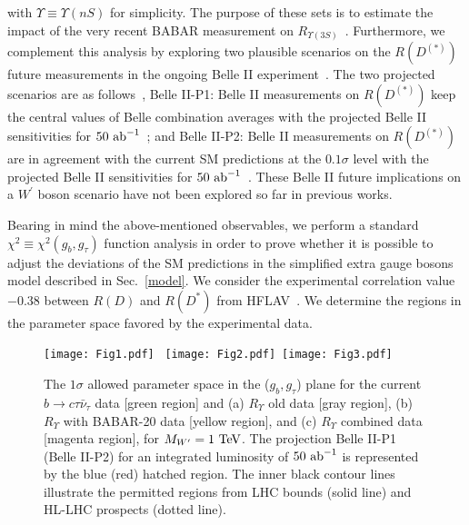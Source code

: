 \documentclass[reprint,showpacs,aps,prd,nofootinbib,superscriptaddress,longbibliography]{revtex4-1}
\begin{document}
\noindent with $\Upsilon \equiv \Upsilon(nS)$ for simplicity. The purpose of these sets is to estimate the impact of the very recent BABAR measurement on $R_{\Upsilon(3S)}$~\cite{Lees:2020kom}. Furthermore, we complement this analysis by exploring two plausible scenarios on the $R(D^{(\ast)})$ future measurements in the ongoing Belle II experiment~\cite{Kou:2018nap}. The two projected scenarios are as follows~\cite{Cardozo:2020uol}, Belle II-P1: Belle II measurements on $R(D^{(\ast)})$ keep the central values of Belle combination averages with the projected Belle II sensitivities for $50 \ {\rm ab}^{-1}$~\cite{Kou:2018nap}; and Belle II-P2: Belle II measurements on $R(D^{(\ast)})$ are in agreement with the current SM predictions at the $0.1\sigma$ level with the projected Belle II sensitivities for $50 \ {\rm ab}^{-1}$~\cite{Kou:2018nap}. These Belle II future implications on a $W^{\prime}$ boson scenario have not been explored so far in previous works. 

Bearing in mind the above-mentioned observables, we perform a standard $\chi^2 \equiv \chi^2(g_b,g_\tau)$ function analysis in order to prove whether it is possible to adjust the deviations of the SM predictions in the simplified extra gauge bosons model described in Sec.~\ref{model}. We consider the experimental correlation value $-0.38$ between $R(D)$ and $R(D^\ast)$ from HFLAV~\cite{Amhis:2019ckw,HFLAVsummer}. We determine the regions in the parameter space favored by the experimental data.

\begin{figure*}[!t]
\centering
\texttt{[image: Fig1.pdf]} \ 
\texttt{[image: Fig2.pdf]}\ 
\texttt{[image: Fig3.pdf]}
\caption{\small The $1\sigma$ allowed parameter space in the ($g_b,g_\tau$) plane for the current $b\to c \tau \bar{\nu}_{\tau}$ data [green region] and (a) $R_\Upsilon$ old data [gray region], (b) $R_\Upsilon$ with BABAR-20 data [yellow region], and (c) $R_\Upsilon$ combined data [magenta region], for $M_{W^\prime} = 1 \ {\rm TeV}$. The projection Belle II-P1 (Belle II-P2) for an integrated luminosity of $50 \ {\rm ab}^{-1}$ is represented by the blue (red) hatched region. The inner black contour lines illustrate the permitted regions from LHC bounds (solid line) and HL-LHC prospects (dotted line).}
\label{ParameterSpace1}
\end{figure*}
\end{document}
